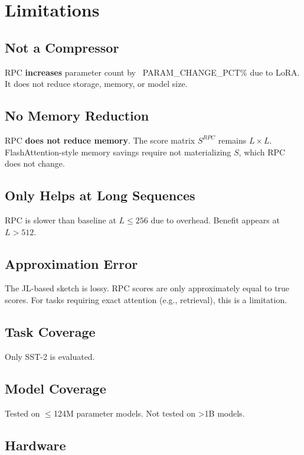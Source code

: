 
\section{Limitations}

\subsection{Not a Compressor}

RPC \textbf{increases} parameter count by ~{{PARAM\_CHANGE\_PCT}}\% due to LoRA. It 
does not reduce storage, memory, or model size.

\subsection{No Memory Reduction}

RPC \textbf{does not reduce memory}. The score matrix $S^{RPC}$ remains $L \times L$. 
FlashAttention-style memory savings require not materializing $S$, which 
RPC does not change.

\subsection{Only Helps at Long Sequences}

RPC is slower than baseline at $L \leq 256$ due to overhead. Benefit appears 
at $L > 512$.

\subsection{Approximation Error}

The JL-based sketch is lossy. RPC scores are only approximately equal to 
true scores. For tasks requiring exact attention (e.g., retrieval), this 
is a limitation.

\subsection{Task Coverage}

Only SST-2 is evaluated.

\subsection{Model Coverage}

Tested on $\le$124M parameter models. Not tested on >1B models.

\subsection{Hardware}

